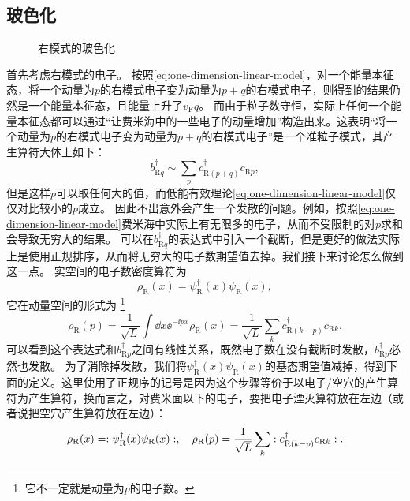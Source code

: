\subsection{玻色化}

\begin{figure}
    \subfigure[基态]{
        
    }
    \caption{右模式的玻色化}
\end{figure}

首先考虑右模式的电子。
按照\eqref{eq:one-dimension-linear-model}，对一个能量本征态，将一个动量为$p$的右模式电子变为动量为$p+q$的右模式电子，则得到的结果仍然是一个能量本征态，且能量上升了$v_\text{F} q$。
而由于粒子数守恒，实际上任何一个能量本征态都可以通过“让费米海中的一些电子的动量增加”构造出来。这表明“将一个动量为$p$的右模式电子变为动量为$p+q$的右模式电子”是一个准粒子模式，其产生算符大体上如下：
\[
    {b}_{\text{R} q}^\dagger \sim \sum_p {c}^\dagger_{\text{R} (p+q)} {c}_{\text{R} p} ,
\]
但是这样$p$可以取任何大的值，而低能有效理论\eqref{eq:one-dimension-linear-model}仅仅对比较小的$p$成立。
因此不出意外会产生一个发散的问题。例如，按照\eqref{eq:one-dimension-linear-model}费米海中实际上有无限多的电子，从而不受限制的对$p$求和会导致无穷大的结果。
可以在${b}_{\text{R} q}^\dagger$的表达式中引入一个截断，但是更好的做法实际上是使用正规排序，从而将无穷大的电子数期望值去掉。我们接下来讨论怎么做到这一点。
实空间的电子数密度算符为
\[
    {\rho}_\text{R}(x) = {\psi}_\text{R}^\dagger(x) {\psi}_\text{R}(x),
\]
它在动量空间的形式为%
\footnote{它不一定就是动量为$p$的电子数。}%
\[
    {\rho}_\text{R}(p) = \frac{1}{\sqrt{L}} \int \dd{x} \ee^{-\ii p x} {\rho}_\text{R}(x) = \frac{1}{\sqrt{L}} \sum_k {c}^\dagger_{\text{R} (k - p)} {c}_{\text{R} k}.
\]
可以看到这个表达式和${b}^\dagger_{\text{R} p}$之间有线性关系，既然电子数在没有截断时发散，${b}^\dagger_{\text{R} p}$必然也发散。
为了消除掉发散，我们将${\psi}_\text{R}^\dagger(x) {\psi}_\text{R}(x)$的基态期望值减掉，得到下面的定义。这里使用了正规序的记号是因为这个步骤等价于以电子/空穴的产生算符为产生算符，换而言之，对费米面以下的电子，要把电子湮灭算符放在左边（或者说把空穴产生算符放在左边）：
\begin{equation}
    {\rho}_\text{R}(x) = : {\psi}_\text{R}^\dagger(x) {\psi}_\text{R}(x) :, \quad {\rho}_\text{R}(p) = \frac{1}{\sqrt{L}} \sum_k : {c}^\dagger_{\text{R} (k - p)} {c}_{\text{R} k} :.
\end{equation}
